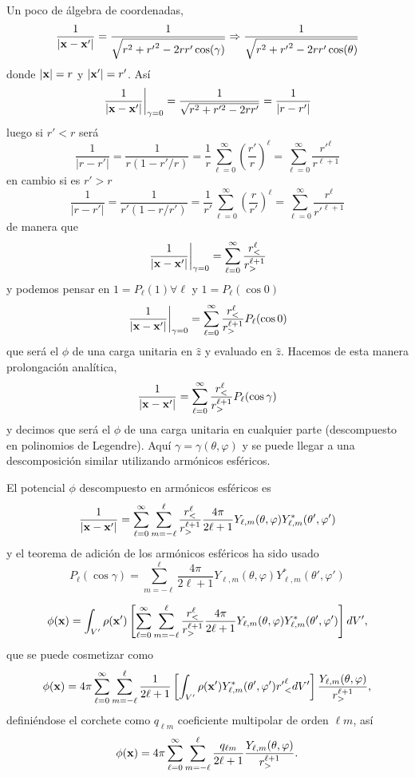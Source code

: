 \documentclass[10pt,oneside]{CBFT_book}
\begin{document}
Un poco de álgebra de coordenadas,
\[
	\frac{1}{|\vb{x}-\vb{x}'|} = \frac{1}{\sqrt{r^2 + {r'}^2  - 2rr'\cos(\gamma)}} \Rightarrow
	\frac{1}{\sqrt{r^2 + {r'}^2  - 2rr'\cos(\theta)}}
\]
donde $|\vb{x}|=r$ y $|\vb{x}'|=r'$. Así
\[
	\left. \frac{1}{|\vb{x}-\vb{x}'|} \right|_{\gamma=0} = \frac{1}{\sqrt{r^2 + r'^2 -2rr'}}=
	\frac{1}{|r-r'|}
\]
luego si $r'<r$ será
\[
	\frac{1}{|r-r'|} = \frac{1}{r(1 - r'/r )} = \frac{1}{r} \sum_{\ell=0}^\infty \left(\frac{r'}{r}\right)^\ell = 
	\sum_{\ell=0}^\infty \frac{r'^\ell}{r^{\ell+1}}
\]
en cambio si es $r'>r$
\[
	\frac{1}{|r-r'|} = \frac{1}{r'(1 - r/r' )} = \frac{1}{r'} \sum_{\ell=0}^\infty \left(\frac{r}{r'}\right)^\ell = 
	\sum_{\ell=0}^\infty \frac{r^\ell}{r'^{\ell+1}}
\]
de manera que
\[
	\left. \frac{1}{|\vb{x}-\vb{x}'|} \right|_{\gamma=0} = \sum_{\ell=0}^\infty  \frac{r_<^\ell}{r_>^{\ell+1}}
\]
y podemos pensar en $1=P_\ell(1) \forall \ell$ y $1=P_\ell(\cos 0)$
\[
	\left. \frac{1}{|\vb{x}-\vb{x}'|} \right|_{\gamma=0} = \sum_{\ell=0}^\infty  \frac{r_<^\ell}{r_>^{\ell+1}}
	P_\ell(\cos 0)
\]
que será el $\phi$ de una carga unitaria en $\hat{z}$ y evaluado en $\hat{z}$.
Hacemos de esta manera prolongación analítica,
\[
	\frac{1}{|\vb{x}-\vb{x}'|}  = \sum_{\ell=0}^\infty  \frac{r_<^\ell}{r_>^{\ell+1}}
	P_\ell(\cos \gamma)
\]
y decimos que será el $\phi$ de una carga unitaria en cualquier parte (descompuesto en polinomios de Legendre).
Aquí $\gamma=\gamma(\theta,\varphi)$ y se puede llegar a una descomposición similar utilizando armónicos esféricos.

El potencial $\phi$ descompuesto en armónicos esféricos es
\[
	\frac{1}{|\vb{x}-\vb{x}'|}  = \sum_{\ell=0}^\infty \sum_{m=-\ell}^\ell \frac{r_<^\ell}{r_>^{\ell+1}}
	\frac{4\pi}{2\ell+1} Y_{\ell,m}(\theta,\varphi) Y_{\ell,m}^*(\theta',\varphi')
\]
y el teorema de adición de los armónicos esféricos ha sido usado
\[
	P_\ell(\cos \gamma) = \sum_{m=-\ell}^\ell \frac{4\pi}{2\ell+1} Y_{\ell,m}(\theta,\varphi) 
	Y_{\ell,m}^*(\theta',\varphi')
\]

\[
	\phi(\vb{x})= \int_{V'} \rho(\vb{x}')\left[ \sum_{\ell=0}^\infty \sum_{m=-\ell}^\ell 
	\frac{r_<^\ell}{r_>^{\ell+1}}\frac{4\pi}{2\ell+1} Y_{\ell,m}(\theta,\varphi) 
	Y_{\ell,m}^*(\theta',\varphi')\right] dV',
\]
que se puede cosmetizar como
\[
	\phi(\vb{x})= 4\pi \sum_{\ell=0}^\infty \sum_{m=-\ell}^\ell \frac{1}{2\ell+1} \left[
	\int_{V'} \rho(\vb{x}') Y_{\ell,m}^*(\theta',\varphi') {r'}_<^\ell dV' \right] 
	\frac{Y_{\ell,m}(\theta,\varphi) }{r_>^{\ell+1}},
\]
definiéndose el corchete como $q_{\ell m}$ coeficiente multipolar de orden $\ell m$, así
\[
	\phi(\vb{x})= 4\pi \sum_{\ell=0}^\infty \sum_{m=-\ell}^\ell \frac{q_{\ell m}}{2\ell+1} 
	\frac{Y_{\ell,m}(\theta,\varphi) }{r_>^{\ell+1}}.
\]
\end{document}
